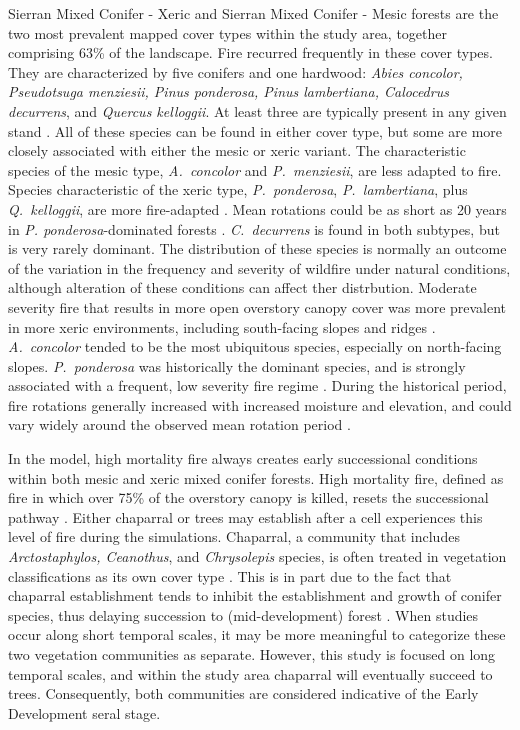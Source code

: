 Sierran Mixed Conifer - Xeric and Sierran Mixed Conifer - Mesic forests are the two most prevalent mapped cover types within the study area, together comprising 63\% of the landscape. Fire recurred frequently in these cover types. They are characterized by five conifers and one hardwood: \emph{Abies concolor, Pseudotsuga menziesii, Pinus ponderosa, Pinus lambertiana, Calocedrus decurrens}, and \emph{Quercus kelloggii}. At least three are typically present in any given stand \citep{Landfire2007}. All of these species can be found in either cover type, but some are more closely associated with either the mesic or xeric variant. The characteristic species of the mesic type, \emph{A.~concolor} and \emph{P.~menziesii}, are less adapted to fire. Species characteristic of the xeric type, \emph{P.~ponderosa}, \emph{P.~lambertiana}, plus \emph{Q.~kelloggii}, are more fire-adapted \citep{Landfire2007}. Mean rotations could be as short as 20 years in \emph{P. ponderosa}-dominated forests \citep{Mallek2013}. \emph{C.~decurrens} is found in both subtypes, but is very rarely dominant. The distribution of these species is normally an outcome of the variation in the frequency and severity of wildfire under natural conditions, although alteration of these conditions can affect ther distrbution. Moderate severity fire that results in more open overstory canopy cover was more prevalent in more xeric environments, including south-facing slopes and ridges \citep{Mallek2013,Safford2014,SNEP1996a,SNEP1996}. \emph{A.~concolor} tended to be the most ubiquitous species, especially on north-facing slopes. \emph{P.~ponderosa} was historically the dominant species, and is strongly associated with a frequent, low severity fire regime \citep{WHR1988,Landfire2007}. During the historical period, fire rotations generally increased with increased moisture and elevation, and could vary widely around the observed mean rotation period \citep{Mallek2013}. 


In the model, high mortality fire always creates early successional conditions within both mesic and xeric mixed conifer forests. High mortality fire, defined as fire in which over 75\% of the overstory canopy is killed, resets the successional pathway \citep{Agee1993}. Either chaparral or trees may establish after a cell experiences this level of fire during the simulations. Chaparral, a community that includes \emph{Arctostaphylos, Ceanothus}, and \emph{Chrysolepis} species, is often treated in vegetation classifications as its own cover type \citep{USDAForestService2008,VandeWater2011}. This is in part due to the fact that chaparral establishment tends to inhibit the establishment and growth of conifer species, thus delaying succession to (mid-development) forest \citep{Landfire2007}. When studies occur along short temporal scales, it may be more meaningful to categorize these two vegetation communities as separate. However, this study is focused on long temporal scales, and within the study area chaparral will eventually succeed to trees. Consequently, both communities are considered indicative of the Early Development seral stage.

